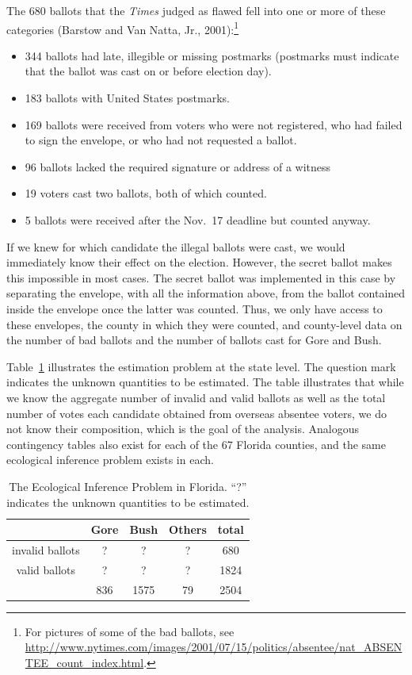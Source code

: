 \documentclass[11pt,titlepage]{article}
\begin{document}
The 680 ballots that the \emph{Times} judged as flawed fell into one
or more of these categories (Barstow and Van Natta, Jr.,
2001):\footnote{For pictures of some of the bad ballots, see
  \url{http://www.nytimes.com/images/2001/07/15/politics/absentee/nat_ABSENTEE_count_index.html}.}
\begin{itemize}
\item 344 ballots had late, illegible or missing postmarks (postmarks
  must indicate that the ballot was cast on or before election day).
\item 183 ballots with United States postmarks.
\item 169 ballots were received from voters who were not registered,
  who had failed to sign the envelope, or who had not requested a
  ballot.
\item 96 ballots lacked the required signature or address of a witness
\item 19 voters cast two ballots, both of which counted.
\item 5 ballots were received after the Nov.\ 17 deadline but counted
  anyway.
\end{itemize}

If we knew for which candidate the illegal ballots were cast, we would
immediately know their effect on the election. However, the secret
ballot makes this impossible in most cases.  The secret ballot was
implemented in this case by separating the envelope, with all the
information above, from the ballot contained inside the envelope once
the latter was counted.  Thus, we only have access to these envelopes,
the county in which they were counted, and county-level data on the
number of bad ballots and the number of ballots cast for Gore and
Bush.

Table~\ref{tb:ballots} illustrates the estimation problem at the state
level. The question mark indicates the unknown quantities to be
estimated.  The table illustrates that while we know the aggregate
number of invalid and valid ballots as well as the total number of
votes each candidate obtained from overseas absentee voters, we do not
know their composition, which is the goal of the analysis.  Analogous
contingency tables also exist for each of the 67 Florida counties, and
the same ecological inference problem exists in each.
\begin{table}[t]
  \begin{center}
    \begin{tabular}{ccccc}
      & Gore  & Bush & Others & total  \\
      \hline 
      invalid ballots &   ?   &   ?  &   ?    &  680   \\
      valid ballots   &   ?   &   ?  &   ?    & 1824   \\
      \hline
      & 836   & 1575 &   79   & 2504   \\
    \end{tabular} \caption{The Ecological Inference Problem in Florida.  
      ``?'' indicates the unknown quantities to be
      estimated.}\label{tb:ballots}
  \end{center}
\end{table} 
\end{document}
